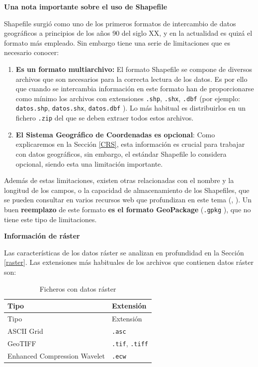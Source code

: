 \documentclass[
]{book}
\theoremstyle{definition}
\theoremstyle{definition}
\theoremstyle{definition}
\theoremstyle{definition}
\theoremstyle{remark}
\begin{document}
\textbf{Una nota importante sobre el uso de Shapefile}

Shapefile surgió como uno de los primeros formatos de intercambio de datos
geográficos a principios de los años 90 del siglo XX, y en la actualidad es
quizá el formato más empleado. Sin embargo tiene una serie de limitaciones que
es necesario conocer:

\begin{enumerate}
\def\labelenumi{\arabic{enumi}.}
\item
  \textbf{Es un formato multiarchivo:} El formato Shapefile se compone de diversos
  archivos que son necesarios para la correcta lectura de los datos. Es por
  ello que cuando se intercambia información en este formato han de
  proporcionarse como mínimo los archivos con extensiones \texttt{.shp}, \texttt{.shx},
  \texttt{.dbf} (por ejemplo: \texttt{datos.shp}, \texttt{datos.shx}, \texttt{datos.dbf} ). Lo más
  habitual es distribuirlos en un fichero \texttt{.zip} del que se deben extraer
  todos estos archivos.
\item
  \textbf{El Sistema Geográfico de Coordenadas es opcional}: Como explicaremos en
  la Sección \ref{CRS}, esta información es crucial para trabajar con datos
  geográficos, sin embargo, el estándar Shapefile lo considera opcional,
  siendo esta una limitación importante.
\end{enumerate}

Además de estas limitaciones, existen otras relacionadas con el nombre y la
longitud de los campos, o la capacidad de almacenamiento de los Shapefiles, que
se pueden consultar en varios recursos web que profundizan en este tema
(\citet{morales2012}, \citet{opengeolabs2017}). Un buen \textbf{reemplazo} de este formato \textbf{es el
formato GeoPackage} (\texttt{.gpkg} ), que no tiene este tipo de limitaciones.

\textbf{Información de ráster}

Las características de los datos ráster se analizan en profundidad en la Sección
\ref{raster}. Las extensiones más habituales de los archivos que contienen
datos ráster son:

\begin{longtable}[]{@{}ll@{}}
\caption{Ficheros con datos ráster}\tabularnewline
\toprule
Tipo & Extensión \\
\midrule
\endfirsthead
\toprule
Tipo & Extensión \\
\midrule
\endhead
ASCII Grid & \texttt{.asc} \\
GeoTIFF & \texttt{.tif}, \texttt{.tiff} \\
Enhanced Compression Wavelet & \texttt{.ecw} \\
\bottomrule
\end{longtable}
\end{document}
